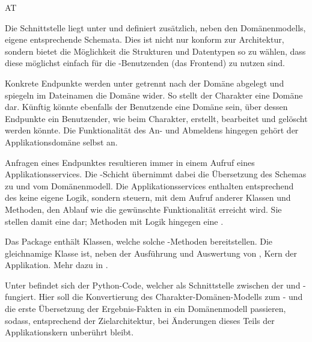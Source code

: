 \begin{enumerateWithCode}[0em plus 1em]{AT}
    \item Die Schnittstelle liegt unter  und definiert zusätzlich, neben den Domänenmodells, eigene entsprechende Schemata.
    Dies ist nicht nur konform zur Architektur, sondern bietet \insb die Möglichkeit die Strukturen und Datentypen so zu wählen, dass diese möglichst einfach für die -Benutzenden (\zB das Frontend) zu nutzen sind.

    \item Konkrete Endpunkte werden unter  getrennt nach der Domäne abgelegt und spiegeln im Dateinamen die Domäne wider.
    So stellt der Charakter eine Domäne dar.
    Künftig könnte ebenfalls der Benutzende eine Domäne sein, über dessen Endpunkte ein Benutzender, wie beim Charakter, erstellt, bearbeitet und gelöscht werden könnte.
    Die Funktionalität des An- und Abmeldens hingegen gehört der Applikationsdomäne  selbst an.

    \item Anfragen eines Endpunktes resultieren immer in einem Aufruf eines Applikationsservices.
    Die -Schicht übernimmt dabei die Übersetzung des Schemas zu und vom Domänenmodell.
    Die Applikationsservices enthalten entsprechend des
     keine eigene Logik, sondern steuern, mit dem Aufruf anderer Klassen und Methoden, den Ablauf wie die gewünschte Funktionalität erreicht wird.
    Sie stellen damit eine  dar; Methoden mit Logik hingegen eine .

    \item Das Package  enthält Klassen, welche solche -Methoden bereitstellen.
    Die gleichnamige Klasse ist, neben der Ausführung und Auswertung von , Kern der Applikation.
    Mehr dazu in .

    \item Unter  befindet sich der Python-Code, welcher als Schnittstelle zwischen der  und - fungiert.
    Hier soll die Konvertierung des Charakter-Domänen-Modells zum - und die erste Übersetzung der Ergebnis-Fakten in ein Domänenmodell passieren, sodass, entsprechend der Zielarchitektur, bei Änderungen dieses Teils der Applikationskern unberührt bleibt.


\end{enumerateWithCode}
